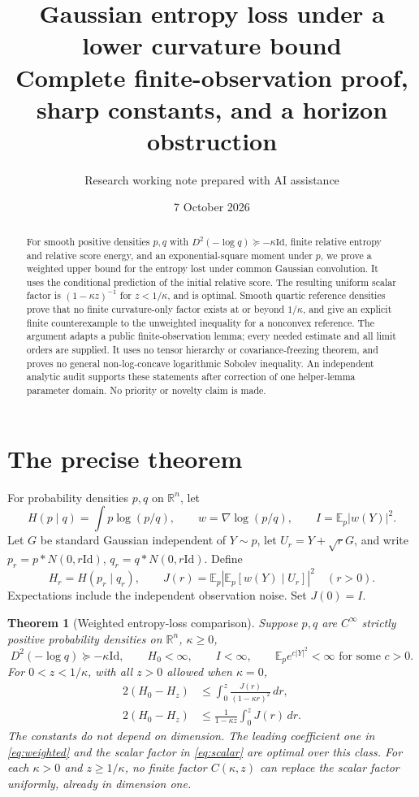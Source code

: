\documentclass[11pt]{article}
\title{Gaussian entropy loss under a lower curvature bound\\\large Complete finite-observation proof, sharp constants, and a horizon obstruction}
\author{Research working note prepared with AI assistance}
\date{7 October 2026}
\newtheorem{theorem}{Theorem}[section]
\theoremstyle{remark}\newtheorem{remark}[theorem]{Remark}
\newcommand{\E}{\mathbb E}
\newcommand{\R}{\mathbb R}
\newcommand{\Id}{\mathrm{Id}}
\newcommand{\abs}[1]{\left|#1\right|}
\begin{document}
\maketitle
\begin{abstract}
For smooth positive densities $p,q$ with $D^2(-\log q)\succeq-\kappa\Id$, finite relative entropy and relative score energy, and an exponential-square moment under $p$, we prove a weighted upper bound for the entropy lost under common Gaussian convolution. It uses the conditional prediction of the initial relative score. The resulting uniform scalar factor is $(1-\kappa z)^{-1}$ for $z<1/\kappa$, and is optimal. Smooth quartic reference densities prove that no finite curvature-only factor exists at or beyond $1/\kappa$, and give an explicit finite counterexample to the unweighted inequality for a nonconvex reference. The argument adapts a public finite-observation lemma; every needed estimate and all limit orders are supplied. It uses no tensor hierarchy or covariance-freezing theorem, and proves no general non-log-concave logarithmic Sobolev inequality. An independent analytic audit supports these statements after correction of one helper-lemma parameter domain. No priority or novelty claim is made.
\end{abstract}
\tableofcontents

\section{The precise theorem}
For probability densities $p,q$ on $\R^n$, let
\[
H(p\mid q)=\int p\log(p/q),\qquad
w=\nabla\log(p/q),\qquad I=\E_p|w(Y)|^2.
\]
Let $G$ be standard Gaussian independent of $Y\sim p$, let
$U_r=Y+\sqrt rG$, and write $p_r=p*N(0,r\Id)$, $q_r=q*N(0,r\Id)$.
Define
\[
H_r=H(p_r\mid q_r),\qquad
J(r)=\E_p\abs{\E_p[w(Y)\mid U_r]}^2 \quad(r>0).
\]
Expectations include the independent observation noise. Set $J(0)=I$.

\begin{theorem}[Weighted entropy-loss comparison]\label{thm:main}
Suppose $p,q$ are $C^\infty$ strictly positive probability densities on $\R^n$,
$\kappa\ge0$,
\[
D^2(-\log q)\succeq-\kappa\Id,\qquad
H_0<\infty,\qquad I<\infty,\qquad
\E_p e^{c|Y|^2}<\infty \text{ for some } c>0.
\]
For $0<z<1/\kappa$, with all $z>0$ allowed when $\kappa=0$,
\begin{align}
2(H_0-H_z)&\le\int_0^z\frac{J(r)}{(1-\kappa r)^2}\,dr,
\label{eq:weighted}\\
2(H_0-H_z)&\le\frac{1}{1-\kappa z}\int_0^z J(r)\,dr.
\label{eq:scalar}
\end{align}
The constants do not depend on dimension. The leading coefficient one in
\eqref{eq:weighted} and the scalar factor in \eqref{eq:scalar} are optimal
over this class. For each $\kappa>0$ and $z\ge1/\kappa$, no finite factor
$C(\kappa,z)$ can replace the scalar factor uniformly, already in dimension one.
\end{theorem}
\end{document}
